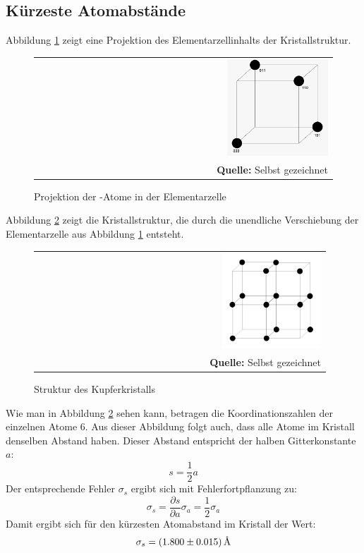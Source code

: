 \documentclass[a4paper,titlepage]{scrartcl}
\newcommand{\angstrom}{\mbox{\normalfont\AA}}
\numberwithin{equation}{section}
\begin{document}
\subsection{Kürzeste Atomabstände}
Abbildung \ref{fig:cu-elementarzelle} zeigt eine Projektion des Elementarzellinhalts der Kristallstruktur.
\begin{figure}[H]
	\centering
	\begin{tabular}{@{}r@{}}
		\includegraphics[width=0.35\textwidth]{cu-elementarzelle.png}\\
		\footnotesize\sffamily\textbf{Quelle:} Selbst gezeichnet
	\end{tabular}
	\caption{Projektion der -Atome in der Elementarzelle}
    \label{fig:cu-elementarzelle}
\end{figure}
Abbildung \ref{fig:cu-kristall} zeigt die Kristallstruktur, die durch die unendliche Verschiebung der Elementarzelle aus Abbildung \ref{fig:cu-elementarzelle} entsteht.
\begin{figure}[H]
	\centering
	\begin{tabular}{@{}r@{}}
		\includegraphics[width=0.35\textwidth]{cu-kristall.png}\\
		\footnotesize\sffamily\textbf{Quelle:} Selbst gezeichnet
	\end{tabular}
	\caption{Struktur des Kupferkristalls}
    \label{fig:cu-kristall}
\end{figure}
Wie man in Abbildung \ref{fig:cu-kristall} sehen kann, betragen die Koordinationszahlen der einzelnen Atome 6. Aus dieser Abbildung folgt auch, dass alle Atome im Kristall denselben Abstand haben. Dieser Abstand entspricht der halben Gitterkonstante $a$:
\begin{equation*}
s=\frac{1}{2} a
\end{equation*}
Der entsprechende Fehler $\sigma_s$ ergibt sich mit Fehlerfortpflanzung zu:
\begin{equation*}
\sigma_s= \frac{\partial s}{\partial a} \sigma_a=\frac{1}{2} \sigma_a
\end{equation*}
Damit ergibt sich für den kürzesten Atomabstand im Kristall der Wert:
\begin{equation*}
\sigma_s=\unit[(1.800 \pm 0.015)]{\angstrom}
\end{equation*}
\end{document}
